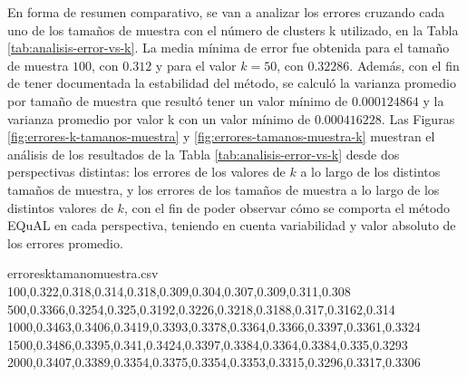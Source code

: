 \bigskip En forma de resumen comparativo, se van a analizar los errores cruzando cada uno de los tamaños de muestra con el número de clusters k utilizado, en la Tabla \ref{tab:analisis-error-vs-k}. La media mínima de error fue obtenida para el tamaño de muestra \(100\), con \(0.312\) y para el valor \(k = 50\), con \(0.32286\). Además, con el fin de tener documentada la estabilidad del método, se calculó la varianza promedio por tamaño de muestra que resultó tener un valor mínimo de \(0.000124864\) y la varianza promedio por valor k con un valor mínimo de \(0.000416228\). Las Figuras \ref{fig:errores-k-tamanos-muestra} y \ref{fig:errores-tamanos-muestra-k} muestran el análisis de los resultados de la Tabla \ref{tab:analisis-error-vs-k} desde dos perspectivas distintas: los errores de los valores de \(k\) a lo largo de los distintos tamaños de muestra, y los errores de los tamaños de muestra a lo largo de los distintos valores de \(k\), con el fin de poder observar cómo se comporta el método EQuAL en cada perspectiva, teniendo en cuenta variabilidad y valor absoluto de los errores promedio.

\begin{filecontents*}{erroresktamanomuestra.csv}
100,0.322,0.318,0.314,0.318,0.309,0.304,0.307,0.309,0.311,0.308
500,0.3366,0.3254,0.325,0.3192,0.3226,0.3218,0.3188,0.317,0.3162,0.314
1000,0.3463,0.3406,0.3419,0.3393,0.3378,0.3364,0.3366,0.3397,0.3361,0.3324
1500,0.3486,0.3395,0.341,0.3424,0.3397,0.3384,0.3364,0.3384,0.335,0.3293
2000,0.3407,0.3389,0.3354,0.3375,0.3354,0.3353,0.3315,0.3296,0.3317,0.3306
\end{filecontents*}

